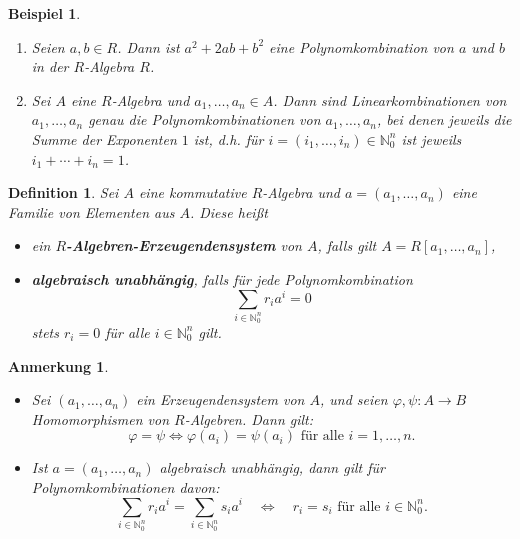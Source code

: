 \documentclass[a4paper, twoside, 11pt, ngerman]{report}
\newcommand{\NN}{\mathds N}
\theoremstyle{definistyle}
\newtheorem{defini}[satz]{Definition}
\newtheorem{anm}[satz]{Anmerkung}
\newtheorem{bsp}[satz]{Beispiel}
\theoremstyle{remark}
\newcommand{\defn}[1]{\textit{\bfseries #1}}
\begin{document}
\begin{bsp}\label{bsp:poly_kom}
\begin{enumerate}[label=(\alph*)]
    \item Seien $a, b \in R$. Dann ist $a^2 + 2ab + b^2$ eine Polynomkombination von $a$ und $b$ in der $R$-Algebra $R$.
    \item Sei $A$ eine $R$-Algebra und $a_1, \ldots, a_n \in A$. Dann sind Linearkombinationen von $a_1, \ldots, a_n$ genau die Polynomkombinationen von $a_1, \ldots, a_n$, bei denen jeweils die Summe der Exponenten $1$ ist, d.h. für $i = (i_1, \ldots, i_n)\in\NN_0^n$ ist jeweils $i_1 + \cdots + i_n = 1$.
\end{enumerate}
\end{bsp}

\begin{defini}\label{def:erzeugungssystem_unab}
Sei $A$ eine kommutative $R$-Algebra und $a = (a_1, \ldots, a_n)$ eine Familie von Elementen aus $A$. Diese heißt
\begin{itemize}
    \item ein \defn{$R$-Algebren-Erzeugendensystem} von $A$, falls gilt $A = R[a_1, \ldots, a_n]$,
    \item \defn{algebraisch unabhängig}, falls für jede Polynomkombination
    \[
    \sum_{i \in \NN_0^n} r_i a^i = 0
    \]
    stets $r_i = 0$ für alle $i \in \NN_0^n$ gilt.
\end{itemize}
\end{defini}

\begin{anm}\label{anm:hom_polykomb}
\begin{itemize}
    \item Sei $(a_1, \ldots, a_n)$ ein Erzeugendensystem von $A$, und seien $\varphi, \psi: A \to B$ Homomorphismen von $R$-Algebren. Dann gilt:
    \[
    \varphi = \psi \iff \varphi(a_i) = \psi(a_i) \text{ für alle } i = 1, \ldots, n.
    \]
    \item Ist $a = (a_1, \ldots, a_n)$ algebraisch unabhängig, dann gilt für Polynomkombinationen davon:
    \[
    \sum_{i \in \NN_0^n} r_i a^i = \sum_{i \in \NN_0^n} s_i a^i \quad \iff \quad r_i = s_i \text{ für alle } i \in \NN_0^n.
    \]
\end{itemize}
\end{anm}
\end{document}
